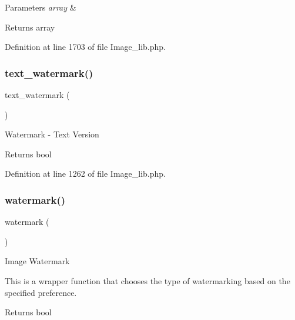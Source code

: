 \begin{DoxyParams}{Parameters}
{\em array} & \\
\hline
\end{DoxyParams}
\begin{DoxyReturn}{Returns}
array 
\end{DoxyReturn}


Definition at line 1703 of file Image\+\_\+lib.\+php.

\mbox{\label{class_c_i___image__lib_afb7640b6150e16b00efac0511d9fa03d}} 
\subsubsection{\texorpdfstring{text\_watermark()}{text\_watermark()}}
{\footnotesize\ttfamily text\+\_\+watermark (\begin{DoxyParamCaption}{ }\end{DoxyParamCaption})}

Watermark -\/ Text Version

\begin{DoxyReturn}{Returns}
bool 
\end{DoxyReturn}


Definition at line 1262 of file Image\+\_\+lib.\+php.

\mbox{\label{class_c_i___image__lib_a4732a76680e7c0b28f98f6634b567cc9}} 
\subsubsection{\texorpdfstring{watermark()}{watermark()}}
{\footnotesize\ttfamily watermark (\begin{DoxyParamCaption}{ }\end{DoxyParamCaption})}

Image Watermark

This is a wrapper function that chooses the type of watermarking based on the specified preference.

\begin{DoxyReturn}{Returns}
bool 
\end{DoxyReturn}


